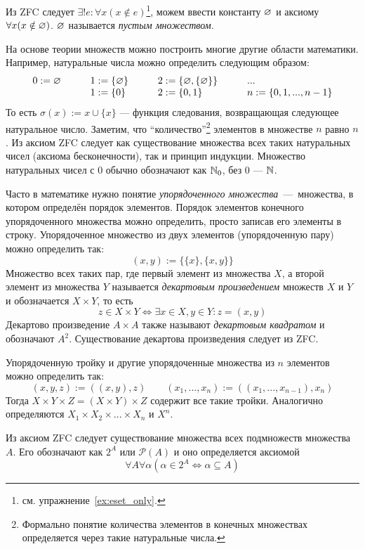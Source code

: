 Из ZFC следует ${\exists !e:\forall x(x\notin e)}$\footnote{
	см. упражнение~\ref{ex:eset_only}.},
можем ввести константу $\varnothing$ и аксиому $\forall x(x\notin \varnothing)$.
$\varnothing$ называется {\it пустым множеством}.

На основе теории множеств можно построить многие другие области математики.
Например, натуральные числа можно определить следующим образом:
\[ \begin{array}{llll}
		0 :=\varnothing\qquad & 1  :=\{\varnothing\}\qquad & 2  :=\{\varnothing,\{\varnothing\}\}\qquad & ... \\
		                & 1:=\{0\}\qquad       & 2:=\{0,1\}
		                & n:=\{0,1,...,n-1\}
	\end{array}
\]
То есть $\sigma(x):=x\cup \{x\}$ --- функция следования,
возвращающая следующее натуральное число. Заметим, что ``количество''\footnote{
	Формально понятие количества элементов в конечных множествах определяется
	через такие натуральные числа.} элементов
в множестве $n$ равно $n$. Из аксиом ZFC следует как существование множества
всех таких натуральных чисел (аксиома бесконечности), так и принцип индукции.
Множество натуральных чисел с $0$ обычно обозначают как $\mathbb N_0$, без $0$ --- $\mathbb N$.

Часто в математике нужно понятие {\it упорядоченного множества}~---~множества,
в котором определён порядок элементов. Порядок элементов
конечного упорядоченного множества можно
определить, просто записав его элементы в строку.
Упорядоченное множество из двух элементов (упорядоченную пару)
можно определить так:
\[
	(x,y):=\{\{x\},\{x,y\}\}
\]
Множество
всех таких пар, где первый элемент из множества $X$, а второй элемент
из множества $Y$ называется {\it декартовым произведением} множеств
$X$ и $Y$ и
обозначается $X\times Y$, то есть
\[
	z\in X\times Y\iff \exists x\in X,y\in Y:z=(x,y)
\]
Декартово произведение $A\times A$ также называют {\it декартовым квадратом}
и обозначают $A^{2}$. Существование декартова произведения следует из ZFC.

Упорядоченную тройку и другие упорядоченные множества из $n$ элементов
можно определить так:
\[
	(x,y,z):=((x,y),z)\qquad (x_1,...,x_{n}):=((x_1,...,x_{n-1}),x_{n})
\]
Тогда $X\times Y\times Z=(X\times Y)\times Z$ содержит все такие тройки.
Аналогично определяются $X_1\times X_2\times ...\times X_{n}$ и $X^{n}$.

Из аксиом ZFC следует существование множества всех подмножеств множества $A$.
Его обозначают как $2^{A}$ или $\mathcal P(A)$ и оно определяется аксиомой
\[
	\forall A\forall \alpha(\alpha\in 2^{A}\iff \alpha\subseteq A)
\]

